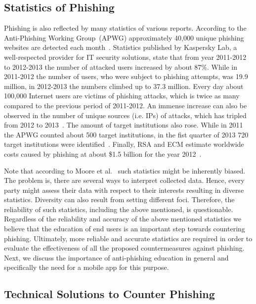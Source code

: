 \subsection{Statistics of Phishing}
\label{s:stats}
Phishing is also reflected by many statistics of various reports. 
 According to the Anti-Phishing Working Group~(APWG) approximately 40,000 unique phishing websites are detected each month~\cite{antiphishingtrendreport2013}. Statistics published by Kaspersky Lab, a well-respected provider for IT security solutions, state that from year 2011-2012 to 2012-2013 the number of attacked users increased by about 87\%. While in 2011-2012 the number of users, who were subject to phishing attempts, was 19.9 million, in 2012-2013 the numbers climbed up to 37.3 million. 
 Every day about 100,000 Internet users are victims of phishing attacks, which is twice as many compared to the previous period of 2011-2012. An immense increase can also be observed in the number of unique sources (i.e. IPs) of attacks, which has tripled from 2012 to 2013~\cite{kasperskyreport2013}. The amount of target institutions also rose. 
 While in 2011 the APWG counted about 500 target institutions, in the fist quarter of 2013 720 target institutions were identified~\cite{antiphishingglobalreport2013}. 
Finally, RSA and ECM estimate worldwide costs caused by phishing at about \$1.5 billion for the year 2012~\cite{rsa2013}. 

Note that according to Moore et al.~\cite{moore2010hard} such statistics might be inherently biased. 
The problem is, there are several ways to interpret collected data. 
Hence, every party might assess their data with respect to their interests resulting in diverse statistics. 
Diversity can also result from setting different foci.
Therefore, the reliability of such statistics, including the above mentioned, is questionable. 
Regardless of the reliability and accuracy of the above mentioned statistics we believe that the education of end users is an important step towards countering phishing. 
Ultimately, more reliable and accurate statistics are required in order to evaluate the effectiveness of all the proposed countermeasures against phishing. 
Next, we discuss the importance of anti-phishing education in general and specifically the need for a mobile app for this purpose.
\subsection{Technical Solutions to Counter Phishing}

